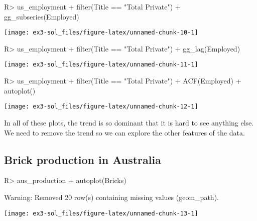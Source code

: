 \documentclass[
]{article}
\begin{document}
\begin{CodeChunk}
\begin{CodeInput}
R> us_employment %
+   filter(Title == "Total Private") %
+   gg_subseries(Employed)
\end{CodeInput}


\begin{center}\texttt{[image: ex3-sol\_files/figure-latex/unnamed-chunk-10-1]} \end{center}

\end{CodeChunk}

\begin{CodeChunk}
\begin{CodeInput}
R> us_employment %
+   filter(Title == "Total Private") %
+   gg_lag(Employed)
\end{CodeInput}


\begin{center}\texttt{[image: ex3-sol\_files/figure-latex/unnamed-chunk-11-1]} \end{center}

\end{CodeChunk}

\begin{CodeChunk}
\begin{CodeInput}
R> us_employment %
+   filter(Title == "Total Private") %
+   ACF(Employed) %
+   autoplot()
\end{CodeInput}


\begin{center}\texttt{[image: ex3-sol\_files/figure-latex/unnamed-chunk-12-1]} \end{center}

\end{CodeChunk}

In all of these plots, the trend is so dominant that it is hard to see anything else. We need to remove the trend so we can explore the other features of the data.

\hypertarget{brick-production-in-australia}{%
\subsection{Brick production in Australia}\label{brick-production-in-australia}}

\begin{CodeChunk}
\begin{CodeInput}
R> aus_production %
+   autoplot(Bricks)
\end{CodeInput}
\begin{CodeOutput}
Warning: Removed 20 row(s) containing missing values (geom_path).
\end{CodeOutput}


\begin{center}\texttt{[image: ex3-sol\_files/figure-latex/unnamed-chunk-13-1]} \end{center}

\end{CodeChunk}
\end{document}
